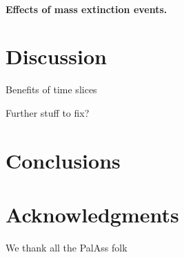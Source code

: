 \documentclass[12pt,a4paper]{article}
\begin{document}
\paragraph{Effects of mass extinction events.}



	


	

\section{Discussion}

Benefits of time slices

Further stuff to fix?



\section{Conclusions}
	

\section{Acknowledgments}
	We thank all the PalAss folk
	
 
 
\end{document}
